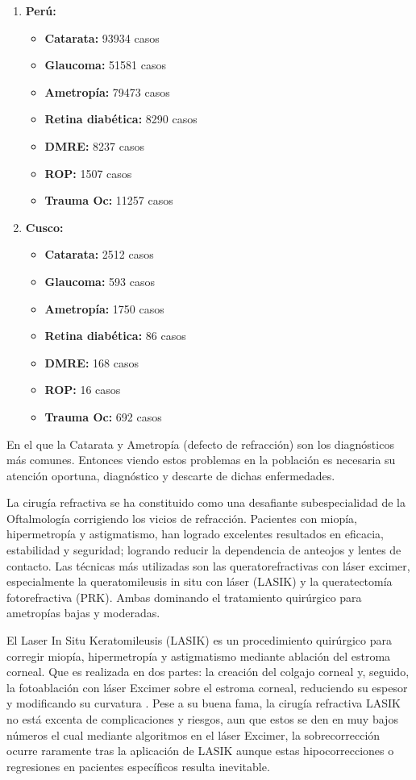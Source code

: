 \begin{enumerate}
    \item \textbf{Perú:}
    \begin{itemize}
        \item \textbf{Catarata: }93934 casos
        \item \textbf{Glaucoma: }51581 casos
        \item \textbf{Ametropía: }79473 casos
        \item \textbf{Retina diabética: }8290 casos
        \item \textbf{DMRE: }8237 casos
        \item \textbf{ROP: }1507 casos
        \item \textbf{Trauma Oc: }11257 casos 
    \end{itemize}
    \item \textbf{Cusco:}
    \begin{itemize}
        \item \textbf{Catarata: }2512 casos
        \item \textbf{Glaucoma: }593 casos
        \item \textbf{Ametropía: }1750 casos
        \item \textbf{Retina diabética: }86 casos
        \item \textbf{DMRE: }168 casos
        \item \textbf{ROP: }16 casos
        \item \textbf{Trauma Oc: }692 casos 
    \end{itemize}
\end{enumerate}
En el que la Catarata y Ametropía (defecto de refracción) son los diagnósticos más comunes. Entonces viendo estos problemas en la población es necesaria su atención oportuna, diagnóstico y descarte de dichas enfermedades.

La cirugía refractiva se ha constituido como una desafiante subespecialidad de la Oftalmología corrigiendo los vicios de refracción. Pacientes con miopía, hipermetropía y astigmatismo, han logrado excelentes resultados en eficacia, estabilidad y seguridad; logrando reducir la dependencia de anteojos y lentes de contacto. Las técnicas más utilizadas son las queratorefractivas con láser excimer, especialmente la queratomileusis in situ con láser (LASIK) y la queratectomía fotorefractiva (PRK). Ambas dominando el tratamiento quirúrgico para ametropías bajas y moderadas. \citep{Ren_Moreno_2010}

El Laser In Situ Keratomileusis (LASIK) es un procedimiento quirúrgico para corregir miopía, hipermetropía y astigmatismo mediante ablación del estroma corneal. Que es realizada en dos partes: la creación del colgajo corneal y, seguido, la fotoablación con láser Excimer sobre el estroma corneal, reduciendo su espesor y modificando su curvatura \citep{sanchez2012cirugia}. Pese a su buena fama, la cirugía refractiva LASIK no está excenta de complicaciones y riesgos, aun que estos se den en muy bajos números el cual mediante algoritmos en el láser Excimer, la sobrecorrección ocurre raramente tras la aplicación de LASIK aunque estas hipocorrecciones o regresiones en pacientes específicos resulta inevitable.

